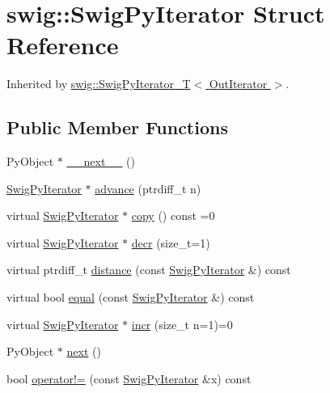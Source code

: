 \hypertarget{structswig_1_1_swig_py_iterator}{}\section{swig\+:\+:Swig\+Py\+Iterator Struct Reference}
\label{structswig_1_1_swig_py_iterator}


Inherited by \hyperlink{classswig_1_1_swig_py_iterator___t}{swig\+::\+Swig\+Py\+Iterator\+\_\+\+T$<$ Out\+Iterator $>$}.

\subsection*{Public Member Functions}
\begin{DoxyCompactItemize}
\item 
Py\+Object $\ast$ \hyperlink{structswig_1_1_swig_py_iterator_a441c6d2f704560c0552a70077b92f749}{\+\_\+\+\_\+next\+\_\+\+\_\+} ()
\item 
\hyperlink{structswig_1_1_swig_py_iterator}{Swig\+Py\+Iterator} $\ast$ \hyperlink{structswig_1_1_swig_py_iterator_ac14880767f73c71e8adb59cac6bed3ef}{advance} (ptrdiff\+\_\+t n)
\item 
virtual \hyperlink{structswig_1_1_swig_py_iterator}{Swig\+Py\+Iterator} $\ast$ \hyperlink{structswig_1_1_swig_py_iterator_ae74c4b06f59975d9df19b30780cdefc1}{copy} () const =0
\item 
virtual \hyperlink{structswig_1_1_swig_py_iterator}{Swig\+Py\+Iterator} $\ast$ \hyperlink{structswig_1_1_swig_py_iterator_aad0c74a8c95526184fefb897476320ef}{decr} (size\+\_\+t=1)
\item 
virtual ptrdiff\+\_\+t \hyperlink{structswig_1_1_swig_py_iterator_a76881aa4c938f5915badd57fc7da074c}{distance} (const \hyperlink{structswig_1_1_swig_py_iterator}{Swig\+Py\+Iterator} \&) const
\item 
virtual bool \hyperlink{structswig_1_1_swig_py_iterator_ab6fc2cfd1457e734739cf3d4bfe39456}{equal} (const \hyperlink{structswig_1_1_swig_py_iterator}{Swig\+Py\+Iterator} \&) const
\item 
virtual \hyperlink{structswig_1_1_swig_py_iterator}{Swig\+Py\+Iterator} $\ast$ \hyperlink{structswig_1_1_swig_py_iterator_a8881170ecd7d9e674ef37eb16b2c9a7a}{incr} (size\+\_\+t n=1)=0
\item 
Py\+Object $\ast$ \hyperlink{structswig_1_1_swig_py_iterator_aafe564ca6084dccf9e98425363c8f9fc}{next} ()
\item 
bool \hyperlink{structswig_1_1_swig_py_iterator_a13f4adca1733e6c24c97c0bcbcb161a2}{operator!=} (const \hyperlink{structswig_1_1_swig_py_iterator}{Swig\+Py\+Iterator} \&x) const

\end{DoxyCompactItemize}
